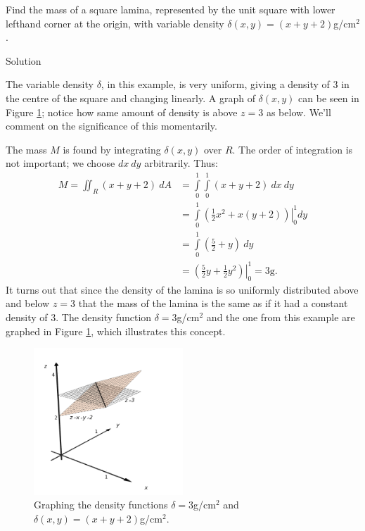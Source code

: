 \begin{example}\label{ex_mass2}
Find the mass of a square lamina, represented by the unit square with lower lefthand corner at the origin, with variable density $\delta(x,y) = (x+y+2)$g/cm$^2$.

Solution 

The variable density $\delta$, in this example, is very uniform, giving a density of 3 in the centre of the square and changing linearly. A graph of $\delta(x,y)$ can be seen in Figure \ref{fig_multiple_17}; notice how same amount of density is above $z=3$ as below. We'll comment on the significance of this momentarily.

The mass $M$ is found by integrating $\delta(x,y)$ over $R$. The order of integration is not important; we choose $dx\ dy$ arbitrarily. Thus:
\allowdisplaybreaks
\begin{align*}
M = \iint_R(x+y+2)\ dA &= \int\limits_0^1\int\limits_0^1 (x+y+2)\ dx\ dy\\
		&= \int\limits_0^1\left.\left(\frac 12x^2+x(y+2)\right)\right|_0^1dy\\
		&= \int\limits_0^1 \left(\frac52+y\right)\ dy\\
		&= \left.\left(\frac52y+\frac12y^2\right)\right|_0^1= 3\text{g}.
\end{align*}
It turns out that since the density of the lamina is so uniformly distributed above and below $z=3$ that the mass of the lamina is the same as if it had a constant density of 3. The density function $\delta=3$g/cm$^2$ and the one from this example are graphed in Figure \ref{fig_multiple_17}, which illustrates this concept.

\begin{figure}[H]
	\begin{center}
			\includegraphics[width=0.5\textwidth]{fig_multiple_17}
	\caption{Graphing the density functions $\delta=3$g/cm$^2$ and $\delta(x,y) = (x+y+2)$g/cm$^2$.}
	\label{fig_multiple_17}
	\end{center}
\end{figure}


\end{example}

